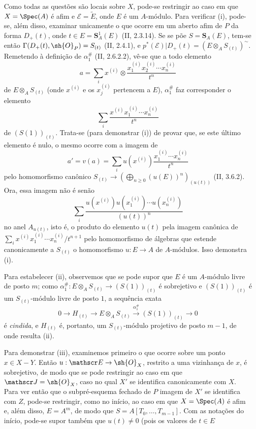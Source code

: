 Como todas as questões são locais sobre $X$, pode-se restringir ao caso em que $X=\Spec(A)$ é afim e $\mathscr E=\widetilde E$, onde $E$ é um $A$-módulo. Para verificar (i), pode-se, além disso, examinar unicamente o que ocorre em um aberto afim de $P$ da forma $D_+(t)$, onde $t\in E=\mathbf S_A^1(E)$ (II, 2.3.14). Se se põe $S=\mathbf S_A(E)$, tem-se então $\Gamma(D_+(t),\sh{O}_P)=S_{(t)}$ (II, 2.4.1), e $p^*(\mathscr E)|D_+(t)=(E\otimes_A S_{(t)})^\sim$. Remetendo à definição de $\alpha_1^{\#}$ (II, 2.6.2.2), vê-se que a todo elemento
\[
  a=\sum_i x^{(i)}\otimes\frac{x_1^{(i)}x_2^{(i)}\cdots x_n^{(i)}}{t^n}
\]
de $E\otimes_A S_{(t)}$ (onde $x^{(i)}$ e os $x_j^{(i)}$ pertencem a $E$), $\alpha_1^{\#}$ faz corresponder o elemento
\[
  \sum_i\frac{x^{(i)}x_1^{(i)}\cdots x_n^{(i)}}{t^n}
\]
de $(S(1))_{(t)}$. Trata-se (para demonstrar (i)) de provar que, se este último elemento é nulo, o mesmo ocorre com a imagem de
\[
  a'=v(a)=\sum_i u(x^{(i)})\frac{x_1^{(i)}\cdots x_n^{(i)}}{t^n}
\]
pelo homomorfismo canônico $S_{(t)}\to(\bigoplus_{n\geq0}(u(E))^n)_{(u(t))}$ (II, 3.6.2). Ora, essa imagem não é senão
\[
  \sum_i\frac{u(x^{(i)})u(x_1^{(i)})\cdots u(x_n^{(i)})}{(u(t))^n}
\]
no anel $A_{u(t)}$, isto é, o produto do elemento $u(t)$ pela imagem canônica de $\sum_i x^{(i)}x_1^{(i)}\cdots x_n^{(i)}/t^{n+1}$ pelo homomorfismo de álgebras que estende canonicamente a $S_{(t)}$ o homomorfismo $u:E\to A$ de $A$-módulos. Isso demonstra (i).

Para estabelecer (ii), observemos que se pode supor que $E$ é um $A$-módulo livre de posto $m$; como $\alpha_1^{\#}:E\otimes_A S_{(t)}\to(S(1))_{(t)}$ é sobrejetivo e $(S(1))_{(t)}$ é um $S_{(t)}$-módulo livre de posto $1$, a sequência exata
\[
  0\longrightarrow H_{(t)}\longrightarrow E\otimes_A S_{(t)}\xrightarrow{\alpha_1^{\#}}(S(1))_{(t)}\longrightarrow0
\]
é \emph{cindida}, e $H_{(t)}$ é, portanto, um $S_{(t)}$-módulo projetivo de posto $m-1$, de onde resulta (ii).

Para demonstrar (iii), examinemos primeiro o que ocorre sobre um ponto $x\in X-Y$. Então $u:\mathscr E\to\sh{O}_X$, restrito a uma vizinhança de $x$, é sobrejetivo, de modo que se pode restringir ao caso em que $\mathscr J=\sh{O}_X$, caso no qual $X'$ se identifica canonicamente com $X$. Para ver então que o subpré-esquema fechado de $P$ imagem de $X'$ se identifica com $Z$, pode-se restringir, como no início, ao caso em que $X=\Spec(A)$ é afim e, além disso, $E=A^m$, de modo que $S=A[T_0,\ldots,T_{m-1}]$. Com as notações do início, pode-se supor também que $u(t)\ne0$ (pois os valores de $t\in E$

